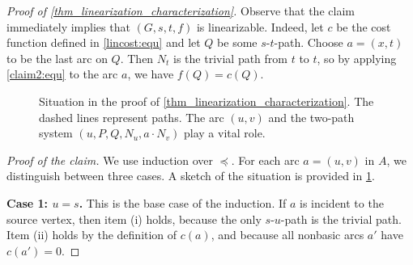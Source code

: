 \begin{proof}[Proof of \cref{thm_linearization_characterization}]
     Observe that  the claim immediately implies  that $(G,s,t, f)$ is linearizable. Indeed, let $c$ be the  cost function defined in \cref{lincost:equ} and  let $Q$ be some $s$-$t$-path. Choose $a = (x,t)$ to be the  last arc on $Q$. Then $N_t$ is the trivial path from $t$ to $t$, so by  applying \cref{claim2:equ} to the arc $a$, we have $f(Q) = c(Q)$. 

\begin{figure}[bth]
\centering
{}
\caption{Situation in the proof of \cref{thm_linearization_characterization}. The dashed lines represent paths. The arc $(u,v)$ and the two-path system $(u,P,Q,N_u, a\cdot N_v)$ play a vital role.}
 \label{fig:specific-system}
\end{figure}
    \textit{Proof of the claim.} We use induction over $\preceq$. For each arc $a = (u, v)$ in $A$, we distinguish between three cases. A sketch of the situation is provided in \cref{fig:specific-system}.
    
    \textbf{Case 1: $u = s$.} This is the base case of the induction. If $a$ is incident to the source vertex, then item (i) holds, because the only $s$-$u$-path is the trivial path. Item (ii) holds by the definition of $c(a)$, and because all nonbasic arcs $a'$ have $c(a') = 0$.
    

\end{proof}
